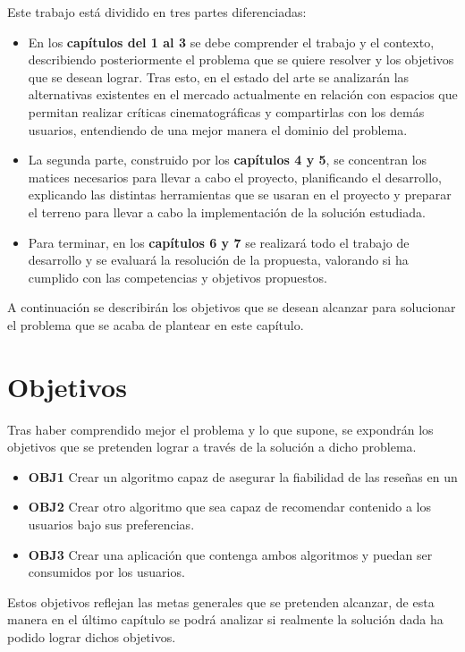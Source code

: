 Este trabajo está dividido en tres partes diferenciadas:
\begin{itemize}
    \item En los \textbf{capítulos del 1 al 3} se debe comprender el trabajo y el contexto, 
    describiendo posteriormente el problema que se quiere resolver y los objetivos que se desean 
    lograr. Tras esto, en el estado del arte se analizarán las alternativas existentes en el mercado 
    actualmente en relación con espacios que permitan realizar críticas cinematográficas y compartirlas 
    con los demás usuarios, entendiendo de una mejor manera el dominio del problema.
    \item La segunda parte, construido por los \textbf{capítulos 4 y 5}, se concentran los matices 
    necesarios para llevar a cabo el proyecto, planificando el desarrollo, explicando las distintas herramientas que se usaran en el proyecto y preparar el terreno para llevar a 
    cabo la implementación de la solución estudiada.
    \item Para terminar, en los \textbf{capítulos 6 y 7} se realizará todo el trabajo de desarrollo y 
    se evaluará la resolución de la propuesta, valorando si ha cumplido con las competencias y 
    objetivos propuestos.
\end{itemize}

A continuación se describirán los objetivos que se desean alcanzar para solucionar el problema que se 
acaba de plantear en este capítulo.

\section{Objetivos}

Tras haber comprendido mejor el problema y lo que supone, se expondrán los objetivos que se pretenden 
lograr a través de la solución a dicho problema.

\begin{itemize}
    \item \textbf{OBJ1} Crear un algoritmo capaz de asegurar la fiabilidad de las reseñas en un %
    \item \textbf{OBJ2} Crear otro algoritmo que sea capaz de recomendar contenido a los usuarios bajo sus preferencias.
    \item \textbf{OBJ3} Crear una aplicación que contenga ambos algoritmos y puedan ser consumidos por los usuarios.
\end{itemize}

Estos objetivos reflejan las metas generales que se pretenden alcanzar, de esta manera en el último 
capítulo se podrá analizar si realmente la solución dada ha podido lograr dichos objetivos.

